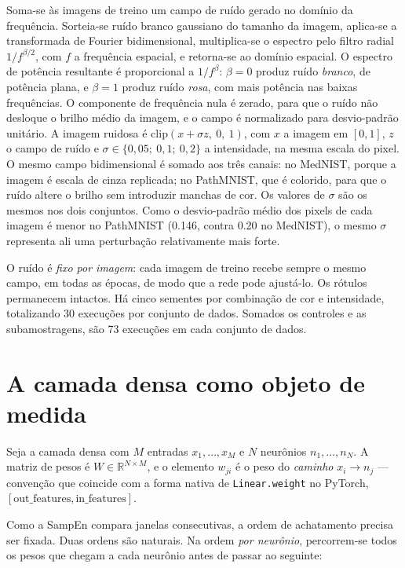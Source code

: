 Soma-se às imagens de treino um campo de ruído gerado no domínio da
frequência. Sorteia-se ruído branco gaussiano do tamanho da imagem, aplica-se a
transformada de Fourier bidimensional, multiplica-se o espectro pelo filtro
radial $1/f^{\beta/2}$, com $f$ a frequência espacial, e retorna-se ao domínio
espacial. O espectro de potência resultante é proporcional a $1/f^{\beta}$:
$\beta = 0$ produz ruído \emph{branco}, de potência plana, e $\beta = 1$
produz ruído \emph{rosa}, com mais potência nas baixas frequências. O
componente de frequência nula é zerado, para que o ruído não desloque o brilho
médio da imagem, e o campo é normalizado para desvio-padrão unitário. A imagem
ruidosa é $\mathrm{clip}(x + \sigma z,\ 0,\ 1)$, com $x$ a imagem em $[0, 1]$, $z$
o campo de ruído e $\sigma \in \{0{,}05;\ 0{,}1;\ 0{,}2\}$ a intensidade, na
mesma escala do pixel. O mesmo campo bidimensional é somado aos três canais:
no MedNIST, porque a imagem é escala de cinza replicada; no PathMNIST, que é
colorido, para que o ruído altere o brilho sem introduzir manchas de cor. Os
valores de $\sigma$ são os mesmos nos dois conjuntos. Como o desvio-padrão
médio dos pixels de cada imagem é menor no PathMNIST (\num{0,146}, contra
\num{0,20} no MedNIST), o mesmo $\sigma$ representa ali uma perturbação
relativamente mais forte.

O ruído é \emph{fixo por imagem}: cada imagem de treino recebe sempre o mesmo
campo, em todas as épocas, de modo que a rede pode ajustá-lo. Os rótulos
permanecem intactos. Há cinco sementes por combinação de cor e intensidade,
totalizando 30 execuções por conjunto de dados. Somados os controles e as
subamostragens, são 73 execuções em cada conjunto de dados.


\section{A camada densa como objeto de medida}
\label{sec:camada-densa}

Seja a camada densa com $M$ entradas $x_1, \dots, x_M$ e $N$ neurônios
$n_1, \dots, n_N$. A matriz de pesos é $W \in \mathbb{R}^{N \times M}$, e
o elemento $w_{ji}$ é o peso do \emph{caminho} $x_i \rightarrow n_j$ ---
convenção que coincide com a forma nativa de \texttt{Linear.weight} no
PyTorch, $[\textrm{out\_features}, \textrm{in\_features}]$.

Como a SampEn compara janelas consecutivas, a ordem de achatamento
precisa ser fixada. Duas ordens são naturais. Na ordem \emph{por
neurônio}, percorrem-se todos os pesos que chegam a cada neurônio antes
de passar ao seguinte:

